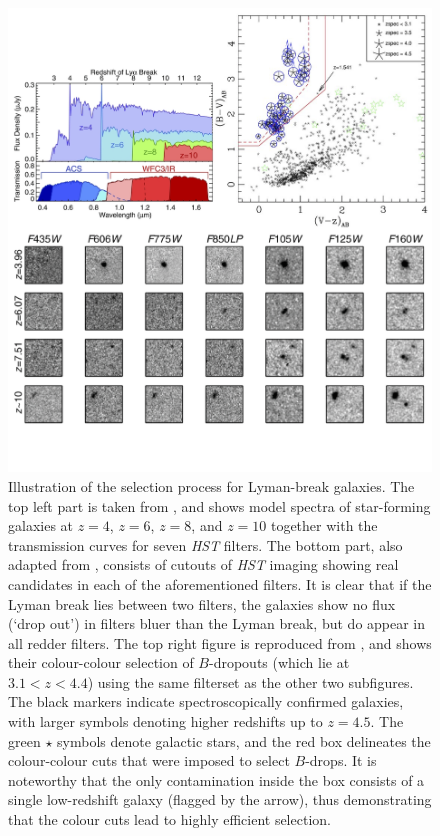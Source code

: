 \begin{figure}[hp] 
\centering    
\includegraphics[width=1.0\textwidth]{Chapter1/Figs/Lyman_break_selection.png}
\caption[Selection of Lyman-break galaxies]{Illustration of the selection process for Lyman-break galaxies. The top left part is taken from \cite{2016PASA...33...37F}, and shows model spectra of star-forming galaxies at $z=4$, $z=6$, $z=8$, and $z=10$ together with the transmission curves for seven \textit{HST} filters. The bottom part, also adapted from \cite{2016PASA...33...37F}, consists of cutouts of \textit{HST} imaging showing real candidates in each of the aforementioned filters. It is clear that if the Lyman break lies between two filters, the galaxies show no flux (`drop out') in filters bluer than the Lyman break, but do appear in all redder filters. The top right figure is reproduced from \cite{2009ApJ...695.1163V}, and shows their colour-colour selection of $B$-dropouts (which lie at $3.1<z<4.4$) using the same filterset as the other two subfigures. The black markers indicate spectroscopically confirmed galaxies, with larger symbols denoting higher redshifts up to $z=4.5$. The green $\star$ symbols denote galactic stars, and the red box delineates the colour-colour cuts that were imposed to select $B$-drops. It is noteworthy that the only contamination inside the box consists of a single low-redshift galaxy (flagged by the arrow), thus demonstrating that the colour cuts lead to highly efficient selection.} 
\label{fig:lyman_break}
\end{figure}


